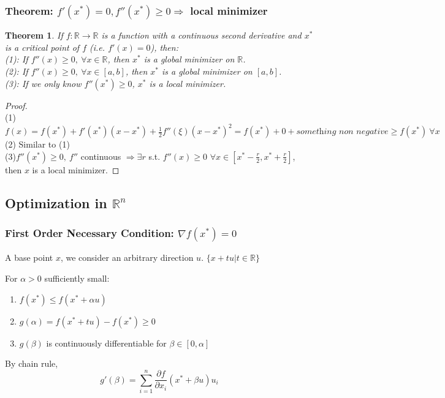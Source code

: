 \documentclass[11pt,a4paper]{article}
\newtheorem{theorem}{Theorem}
\begin{document}
\subsubsection{Theorem: $f'(x^*)=0, f''(x^*)\geq 0 \Rightarrow$ local minimizer}
\begin{theorem}
    If $f:\mathbb{R} \rightarrow \mathbb{R}$ is a function with a continuous second derivative and $x^*$ is a critical point of $f$ (i.e. $f'(x)=0$), then:\\
    (1): If $f''(x)\geq 0,\ \forall x\in\mathbb{R}$, then $x^*$ is a global minimizer on $\mathbb{R}$.\\
    (2): If $f''(x)\geq 0,\ \forall x\in[a,b]$, then $x^*$ is a global minimizer on $[a,b]$.\\
    (3): If we only know $f''(x^*)\geq 0$, $x^*$ is a local minimizer.
\end{theorem}
\begin{proof}
\quad\\
(1)$f(x)=f(x^*)+f'(x^*)(x-x^*)+\frac{1}{2}f''(\xi)(x-x^*)^2=f(x^*)+0+\textit{something non negative}\geq f(x^*)\  \forall x$\\
(2) Similar to (1)\\
(3)$f''(x^*)\geq 0,\ f''$ continuous $\Rightarrow \exists r$ s.t. $f''(x)\geq 0$ $\forall x\in[x^*-\frac{r}{2},x^*+\frac{r}{2}]$, then $x$ is a local minimizer.
\end{proof}


\subsection{Optimization in $\mathbb{R}^n$}
\subsubsection{First Order Necessary Condition: $\nabla f(x^*)=0$}
A base point $x$, we consider an arbitrary direction $u$. $\{x+tu| t\in \mathbb{R}\}$

For $\alpha>0$ sufficiently small:
\begin{enumerate}
    \item $f(x^*)\leq f(x^*+\alpha u)$
    \item $g(\alpha)=f(x^*+tu)-f(x^*)\geq 0$
    \item $g(\beta)$ is continuously differentiable for $\beta\in[0,\alpha]$
\end{enumerate}

By chain rule, $$g'(\beta)=\sum_{i=1}^n \frac{\partial f}{\partial x_i}(x^*+\beta u)u_i$$
\end{document}
